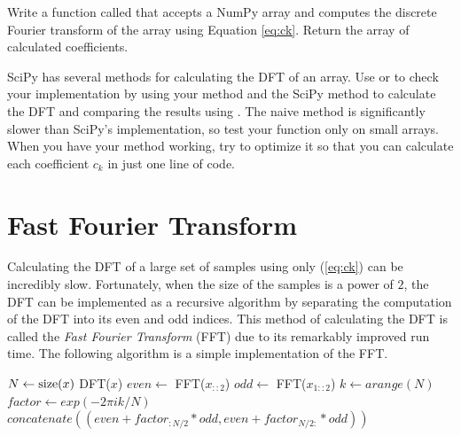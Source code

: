 \begin{problem} 
Write a function called  that accepts a NumPy array and computes the discrete Fourier transform of the array using Equation \ref{eq:ck}.
Return the array of calculated coefficients.

SciPy has several methods for calculating the DFT of an array.
Use  or  to check your implementation by using your method and the SciPy method to calculate the DFT and comparing the results using .
The naive method is significantly slower than SciPy's implementation, so test your function only on small arrays.
When you have your method working, try to optimize it so that you can calculate each coefficient $c_k$ in just one line of code.
\label{prob:dft}
\end{problem}

\section*{Fast Fourier Transform}

Calculating the DFT of a large set of samples using only (\ref{eq:ck}) can be incredibly slow.
Fortunately, when the size of the samples is a power of $2$, the DFT can be implemented as a recursive algorithm by separating the computation of the DFT into its even and odd indices.
This method of calculating the DFT is called the \emph{Fast Fourier Transform} (FFT) due to its remarkably improved run time. 
The following algorithm is a simple implementation of the FFT.

\begin{algorithm}[H]
\begin{algorithmic}[1]
    \State $N \gets \mathrm{size}(x)$
        \State {} DFT($x$)
    \Else{}
        \State $even \gets$ FFT($x_{::2}$)
        \State $odd \gets$ FFT($x_{1::2}$)
        \State $k \gets arange(N)$
        \State $factor \gets exp(-2 \pi ik / N)$
        \State 
        \State {} $concatenate((even + factor_{:N/2} * odd, even + factor_{N/2:} * odd))$
        \EndIf
\EndProcedure
\end{algorithmic}
\caption{}
\label{alg:FFT}
\end{algorithm}

